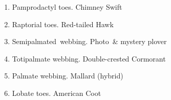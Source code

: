\documentclass[11pt]{article}
\begin{document}
\begin{multicols}{2}
\begin{enumerate}[itemsep=1cm]
\item Pamprodactyl toes. \newline Chimney Swift
\item Raptorial toes. \newline Red-tailed Hawk
\item Semipalmated~webbing. Photo~\& mystery plover%
\item Totipalmate webbing. \newline Double-crested Cormorant
\item Palmate webbing. \newline Mallard (hybrid)
\item Lobate toes. \newline American Coot
\end{enumerate}

\end{multicols}
\end{document}
